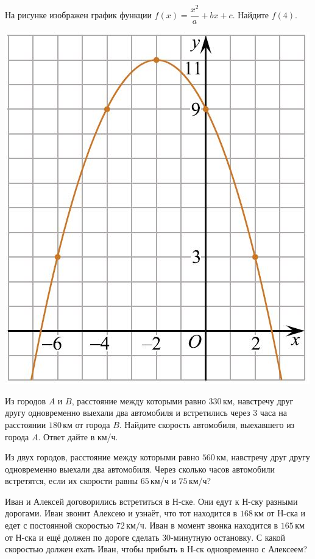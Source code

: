 \begin{class}[number=4]
\begin{listofex}
\begin{minipage}[c]{0.2\textwidth}
		\end{minipage}
		\item
		\begin{minipage}[t]{0.2\textwidth}
			На рисунке изображен график функции \( f(x)=\dfrac{x^2}{a}+bx+c \). Найдите \( f(4) \).
		\end{minipage} 
		\begin{minipage}[c]{0.2\textwidth}
			\includegraphics[align=t, width=\textwidth]{../../pics/G112M3C2-4}
		\end{minipage}
		\item Из городов \( A \) и \( B \), расстояние между которыми равно \( 330 \) км, навстречу друг другу одновременно выехали два автомобиля и встретились через \( 3 \) часа на расстоянии \( 180 \) км от города \( B \). Найдите скорость автомобиля, выехавшего из города \( A \). Ответ дайте в км/ч.
		\item Из двух городов, расстояние между которыми равно \( 560 \) км, навстречу друг другу одновременно выехали два автомобиля. Через сколько часов автомобили встретятся, если их скорости равны \( 65 \) км/ч и \( 75 \) км/ч?
		\item Иван и Алексей договорились встретиться в Н-ске. Они едут к Н-ску разными дорогами. Иван звонит Алексею и узнаёт, что тот находится в \( 168 \) км от Н-ска и едет с постоянной скоростью \( 72 \) км/ч. Иван в момент звонка находится в \( 165 \) км от Н-ска и ещё должен по дороге сделать \( 30 \)-минутную остановку. С какой скоростью должен ехать Иван, чтобы прибыть в Н-ск одновременно с Алексеем?

\end{listofex}
\end{class}
